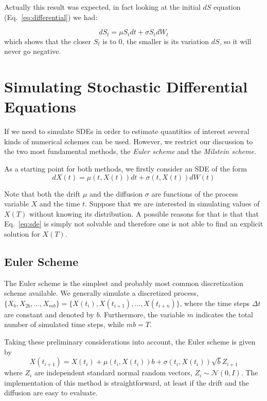 Actually this result was expected, in fact looking at the initial \(dS\) equation (Eq.~\ref{eq:differential}) we had:

\begin{equation}
dS_t = \mu S_tdt + \sigma S_t dW_t
\end{equation}
which shows that the closer \(S_t\) is to 0, the smaller is its variation \(dS\), so it will never go negative.

\section {Simulating Stochastic Differential Equations}
If we need to simulate SDEs in order to estimate quantities of interest several kinds of numerical schemes can be used. However, we restrict our discussion to the two most fundamental methods, the \emph{Euler scheme} and the \emph{Milstein scheme}. 

As a starting point for both methods, we firstly consider an SDE of the form
\begin{equation}
dX(t) = \mu(t, X(t))dt + \sigma(t, X(t)) dW (t)
\label{eq:sde}
\end{equation}

Note that both the drift $\mu$ and the diffusion $\sigma$ are functions of the process variable $X$ and the time $t$. Suppose that we are interested in simulating values of $X(T)$ without knowing its distribution. A possible reasons for that is that that Eq.~\ref{eq:sde} is simply not solvable and therefore one is not able to find an explicit solution for $X(T)$.


\subsection{Euler Scheme}
The Euler scheme is the simplest and probably most common discretization scheme available. We generally simulate a discretized process, $\{X_b, X_{2b},\ldots, X_{mb}\} = \{X(t_i), X(t_{i+1}),...,X(t_{i+n})\}$, where the time steps $\Delta t$ are constant and denoted by $b$. Furthermore, the variable $m$ indicates the total number of simulated time steps, while $mb = T$.

Taking these preliminary considerations into account, the Euler scheme is given by
\begin{equation}
X(t_{i+1}) = X(t_i) + \mu(t_i , X(t_i))b + \sigma(t_i , X(t_i))\sqrt{b}Z_{i+1}
\label{eq:euler_scheme}
\end{equation}
where $Z_i$ are independent standard normal random vectors, $Z_i ∼ \mathcal{N}(0,I)$. 
The implementation of this method is straightforward, at least if the drift and the diffusion are easy to evaluate.


